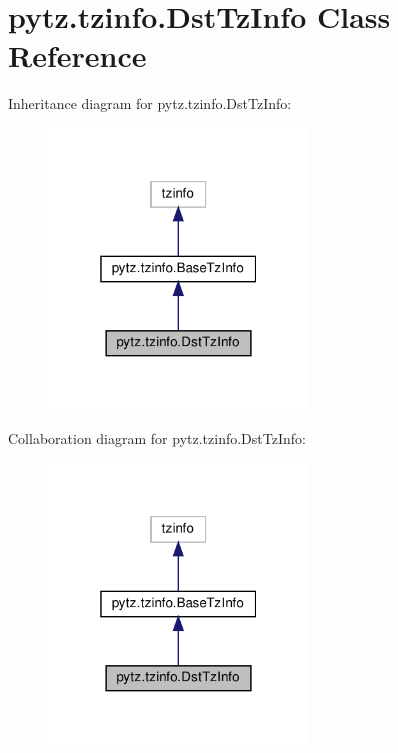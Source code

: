 \hypertarget{classpytz_1_1tzinfo_1_1DstTzInfo}{}\section{pytz.\+tzinfo.\+Dst\+Tz\+Info Class Reference}
\label{classpytz_1_1tzinfo_1_1DstTzInfo}


Inheritance diagram for pytz.\+tzinfo.\+Dst\+Tz\+Info\+:
\nopagebreak
\begin{figure}[H]
\begin{center}
\leavevmode
\includegraphics[width=196pt]{classpytz_1_1tzinfo_1_1DstTzInfo__inherit__graph}
\end{center}
\end{figure}


Collaboration diagram for pytz.\+tzinfo.\+Dst\+Tz\+Info\+:
\nopagebreak
\begin{figure}[H]
\begin{center}
\leavevmode
\includegraphics[width=196pt]{classpytz_1_1tzinfo_1_1DstTzInfo__coll__graph}
\end{center}
\end{figure}
